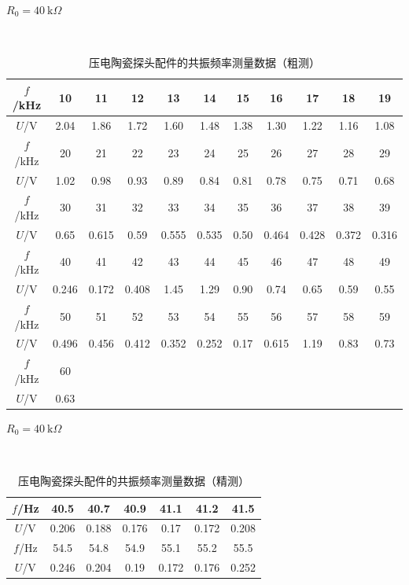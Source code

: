 \documentclass[12pt]{article}
\begin{document}
\begin{table}[H]
    \centering
    \caption{压电陶瓷探头配件的共振频率测量数据（粗测）}
    \vspace{2pt}
    \begin{minipage}{0.7\textwidth}
        \raggedleft
        $R_0= 40\ \mathrm{k}\Omega $
    \end{minipage}\\[2pt]
    \small
\begin{tabular}{ccccccccccc}
\hline\hline
$f$/kHz & 10 & 11 & 12 & 13 & 14 & 15 & 16 & 17 & 18 & 19 \\ \hline
$U$/V  & 2.04 & 1.86 & 1.72 & 1.60 & 1.48 & 1.38 & 1.30 & 1.22 & 1.16 & 1.08 \\ 
\hline\hline
$f$/kHz & 20 & 21 & 22 & 23 & 24 & 25 & 26 & 27 & 28 & 29 \\ \hline
$U$/V  & 1.02 & 0.98 & 0.93 & 0.89 & 0.84 & 0.81 & 0.78 & 0.75 & 0.71 & 0.68 \\ 
\hline\hline
$f$/kHz & 30 & 31 & 32 & 33 & 34 & 35 & 36 & 37 & 38 & 39 \\ \hline
$U$/V  & 0.65 & 0.615 & 0.59 & 0.555 & 0.535 & 0.50 & 0.464 & 0.428 & 0.372 & 0.316 \\ 
\hline\hline
$f$/kHz & 40 & 41 & 42 & 43 & 44 & 45 & 46 & 47 & 48 & 49 \\ \hline
$U$/V  & 0.246 & 0.172 & 0.408 & 1.45 & 1.29 & 0.90 & 0.74 & 0.65 & 0.59 & 0.55 \\ 
\hline\hline
$f$/kHz & 50 & 51 & 52 & 53 & 54 & 55 & 56 & 57 & 58 & 59 \\ \hline
$U$/V  & 0.496 & 0.456 & 0.412 & 0.352 & 0.252 & 0.17 & 0.615 & 1.19 & 0.83 & 0.73 \\ 
\hline\hline
$f$/kHz & 60 &  &  &  &  &  &  &  &  &  \\ \hline
$U$/V  & 0.63 &  &  &  &  &  &  &  &  &  \\ 

\hline\hline
\end{tabular}
\end{table}


\begin{table}[H]
    \centering
    \caption{压电陶瓷探头配件的共振频率测量数据（精测）}
    \vspace{2pt}
    \begin{minipage}{0.7\textwidth}
        \raggedleft
        $R_0= 40\ \mathrm{k}\Omega $
    \end{minipage}\\[2pt]
    \small
\begin{tabular}{ccccccc}
\hline\hline
\hline
$f$/Hz &  40.5 & 40.7 & 40.9 & 41.1 & 41.2 & 41.5  \\ \hline
$U$/V  &  0.206 & 0.188 & 0.176 & 0.17 & 0.172 & 0.208  \\ 
\hline\hline
$f$/Hz & 54.5 & 54.8 & 54.9 & 55.1 & 55.2 & 55.5 \\ \hline
$U$/V  & 0.246 & 0.204 & 0.19 & 0.172 & 0.176 & 0.252 \\

\hline\hline
\end{tabular}
\end{table}
\end{document}
